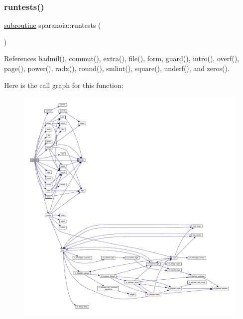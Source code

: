 \mbox{\label{sparanoia_8f90_aff4ac3ebb7f899cf5e1730cd89c06ad1}} 
\subsubsection{\texorpdfstring{runtests()}{runtests()}}
{\footnotesize\ttfamily \hyperlink{M__stopwatch_83_8txt_acfbcff50169d691ff02d4a123ed70482}{subroutine} sparanoia\+::runtests (\begin{DoxyParamCaption}{ }\end{DoxyParamCaption})}



References badmil(), commut(), extra(), file(), form, guard(), intro(), overf(), page(), power(), radx(), round(), smlint(), square(), underf(), and zeros().

Here is the call graph for this function\+:
\nopagebreak
\begin{figure}[H]
\begin{center}
\leavevmode
\includegraphics[width=350pt]{sparanoia_8f90_aff4ac3ebb7f899cf5e1730cd89c06ad1_cgraph}
\end{center}
\end{figure}
\mbox{\label{sparanoia_8f90_a6d17020aa087d1f751f1f0bfcf473d27}} 
